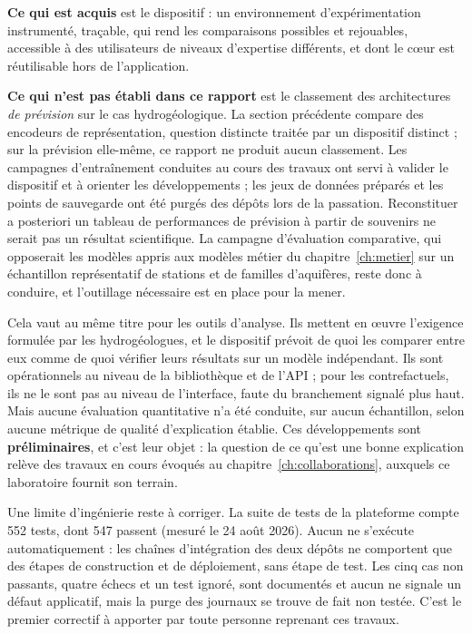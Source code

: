 \textbf{Ce qui est acquis} est le dispositif : un environnement d'expérimentation instrumenté,
traçable, qui rend les comparaisons possibles et rejouables, accessible à des utilisateurs de
niveaux d'expertise différents, et dont le cœur est réutilisable hors de l'application.

\textbf{Ce qui n'est pas établi dans ce rapport} est le classement des architectures \emph{de
prévision} sur le cas hydrogéologique. La section précédente compare des encodeurs de
représentation, question distincte traitée par un dispositif distinct ; sur la prévision
elle-même, ce rapport ne produit aucun classement. Les campagnes d'entraînement conduites au
cours des travaux ont servi à valider le dispositif et à orienter les développements ; les jeux
de données préparés et les points de sauvegarde ont été purgés des dépôts lors de la passation.
Reconstituer a posteriori un tableau de performances de prévision à partir de souvenirs ne
serait pas un résultat scientifique. La
campagne d'évaluation comparative, qui opposerait les modèles appris aux modèles métier du
chapitre~\ref{ch:metier} sur un échantillon représentatif de stations et de familles
d'aquifères, reste donc à conduire, et l'outillage nécessaire est en place pour la mener.

Cela vaut au même titre pour les outils d'analyse. Ils mettent en œuvre l'exigence formulée par
les hydrogéologues, et le dispositif prévoit de quoi les comparer entre eux comme de quoi
vérifier leurs résultats sur un modèle indépendant. Ils sont opérationnels au niveau de la
bibliothèque et de l'API ; pour les contrefactuels, ils ne le sont pas au niveau de l'interface,
faute du branchement signalé plus haut. Mais aucune évaluation
quantitative n'a été conduite, sur aucun échantillon, selon aucune métrique de qualité
d'explication établie. Ces développements sont \textbf{préliminaires}, et c'est leur objet :
la question de ce qu'est une bonne explication relève des travaux en cours évoqués au
chapitre~\ref{ch:collaborations}, auxquels ce laboratoire fournit son terrain.

Une limite d'ingénierie reste à corriger. La suite de tests de la plateforme compte
\num{552} tests, dont \num{547} passent (mesuré le 24 août 2026). Aucun ne s'exécute
automatiquement : les chaînes d'intégration des deux dépôts ne comportent que des étapes de
construction et de déploiement, sans étape de test. Les cinq cas non passants, quatre
échecs et un test ignoré, sont documentés et aucun ne signale un défaut applicatif, mais la
purge des journaux se trouve de fait non testée. C'est le premier correctif à apporter par toute
personne reprenant ces travaux.
